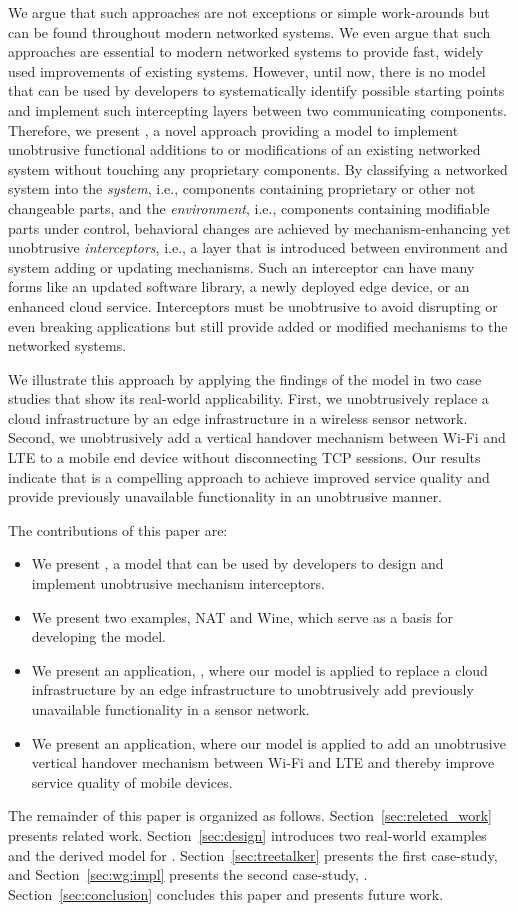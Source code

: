 We argue that such approaches are not exceptions or simple work-arounds but can be found throughout modern networked systems.
We even argue that such approaches are essential to modern networked systems to provide fast, widely used improvements of existing systems.
However, until now, there is no model that can be used by developers to systematically identify possible starting points and implement such intercepting layers between two communicating components.
Therefore, we present \emph{\mm}, a novel approach providing a model to implement unobtrusive functional additions to or modifications of an existing networked system without touching any proprietary components.
By classifying a networked system into the \emph{system}, i.e., components containing proprietary or other not changeable parts, and the \emph{environment}, i.e., components containing modifiable parts under control, 
behavioral changes are achieved by mechanism-enhancing yet unobtrusive \emph{interceptors},
i.e., a layer that is introduced between environment and system adding or updating mechanisms.
Such an interceptor can have many forms like an updated software library, a newly deployed edge device, or an enhanced cloud service.
Interceptors must be unobtrusive to avoid disrupting or even breaking applications but still provide added or modified mechanisms to the networked systems.

We illustrate this approach by applying the findings of the model in two case studies
that show its real-world applicability.
First, we unobtrusively replace a cloud infrastructure by an edge infrastructure in a wireless sensor network.
Second, we unobtrusively add a vertical handover mechanism between Wi-Fi and LTE to a mobile end device without disconnecting TCP sessions.
Our results indicate that \mm is a compelling approach to achieve improved service quality and provide previously unavailable functionality in an unobtrusive manner.

The contributions of this paper are:
\begin{itemize}
    \item We present \mm, a model that can be used by developers to design and implement unobtrusive mechanism interceptors.
    \item We present two examples, NAT and Wine, which serve as a basis for developing the \mm model.
    \item We present an application, \ttt, where our model is applied to replace a cloud infrastructure by an edge infrastructure to unobtrusively add previously unavailable functionality in a sensor network.
    \item We present an application, where our model is applied to add an unobtrusive vertical handover mechanism between Wi-Fi and LTE and thereby improve service quality of mobile devices.
\end{itemize}

The remainder of this paper is organized as follows.
Section~\ref{sec:releted_work} presents related work.
Section~\ref{sec:design} introduces two real-world examples and the derived model for \mm.
Section~\ref{sec:treetalker} presents the first case-study, \ttt and Section~\ref{sec:wg:impl} presents the second case-study, \wgh.
Section~\ref{sec:conclusion} concludes this paper and presents future work.

